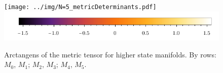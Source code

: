 \begin{figure}[H]
    \centering
    \texttt{[image: ../img/N=5\_metricDeterminants.pdf]}
    \includegraphics[scale=1.2]{../img/N=3_barA.pdf}
    \caption{Arctangens of the metric tensor for higher state manifolds. By  rows: $M_0$, $M_1$; $M_2$, $M_3$; $M_4$, $M_5$.}
    \label{fig:higherStateManifolds}    
\end{figure}
